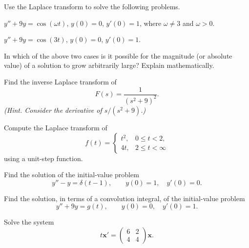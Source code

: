 \documentclass[11pt,oneside]{article}
\begin{document}
\begin{problem}
Use the Laplace transform to solve the following problems.
\begin{problemsubparts}
\item $y''+9y=\cos(\omega t)$, $y(0)=0$, $y'(0)=1$, where $\omega\ne3$ and $\omega>0$.
\item $y''+9y=\cos(3t)$, $y(0)=0$, $y'(0)=1$.
\item In which of the above two cases is it possible for the magnitude (or absolute value) of a solution to grow arbitrarily large? Explain mathematically.
\end{problemsubparts}
\end{problem}

\begin{problem}
Find the inverse Laplace transform of
\[
F(s)=\frac1{(s^2+9)^2}.
\]
\textit{(Hint. Consider the derivative of $s/(s^2+9)$.)}
\end{problem}

\begin{problem}
Compute the Laplace transform of
\[
f(t)=\begin{cases}t^2,&0\le t<2,\\4t,&2\le t<\infty\end{cases}
\]
using a unit-step function.
\end{problem}

\begin{problem}
Find the solution of the initial-value problem
\[
y''-y=\delta(t-1),\qquad y(0)=1,\quad y'(0)=0.
\]
\end{problem}

\begin{problem}
Find the solution, in terms of a convolution integral, of the initial-value problem
\[
y''+9y=g(t),\qquad y(0)=0,\quad y'(0)=1.
\]
\end{problem}

\begin{problem}
Solve the system
\[
t\mathbf x'=\begin{pmatrix}6&2\\4&4\end{pmatrix}\mathbf x.
\]
\end{problem}
\end{document}
